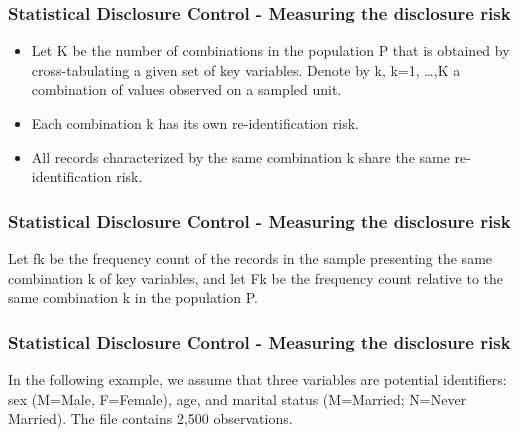 \documentclass[SDCmaster.tex]{subfiles}
\begin{document}
\begin{frame}
	\frametitle{Statistical Disclosure Control - Measuring the disclosure risk}
	\Large
	\begin{itemize}
	\item Let K be the number of combinations in the population P that is obtained by cross-tabulating a given set of key variables. Denote by k, k=1, …,K a combination of values observed on a sampled unit. 
	\item Each combination k has its own re-identification risk. 
	\item All records characterized by the same combination k share the same re-identification risk. 
	\end{itemize}
	

\end{frame}
\begin{frame}
	\frametitle{Statistical Disclosure Control - Measuring the disclosure risk}
	\Large
	Let fk be the frequency count of the records in the sample presenting the same combination k of key variables, and let Fk be the frequency count relative to the same combination k in the population P.
\end{frame}
\begin{frame}
	\frametitle{Statistical Disclosure Control - Measuring the disclosure risk}
	\Large
	
In the following example, we assume that three variables are potential identifiers: sex (M=Male, F=Female), age, and marital status (M=Married; N=Never Married). The file contains 2,500 observations.
\end{frame}
\end{document}
